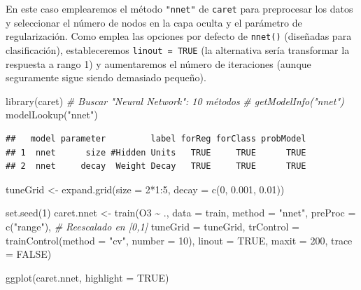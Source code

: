 \documentclass[
  spanish,
]{book}
\newenvironment{Shaded}{\begin{snugshade}}{\end{snugshade}}
\newcommand{\AttributeTok}[1]{\textcolor[rgb]{0.77,0.63,0.00}{#1}}
\newcommand{\CommentTok}[1]{\textcolor[rgb]{0.56,0.35,0.01}{\textit{#1}}}
\newcommand{\ConstantTok}[1]{\textcolor[rgb]{0.00,0.00,0.00}{#1}}
\newcommand{\DecValTok}[1]{\textcolor[rgb]{0.00,0.00,0.81}{#1}}
\newcommand{\FloatTok}[1]{\textcolor[rgb]{0.00,0.00,0.81}{#1}}
\newcommand{\FunctionTok}[1]{\textcolor[rgb]{0.00,0.00,0.00}{#1}}
\newcommand{\NormalTok}[1]{#1}
\newcommand{\OtherTok}[1]{\textcolor[rgb]{0.56,0.35,0.01}{#1}}
\newcommand{\SpecialCharTok}[1]{\textcolor[rgb]{0.00,0.00,0.00}{#1}}
\newcommand{\StringTok}[1]{\textcolor[rgb]{0.31,0.60,0.02}{#1}}
\theoremstyle{break}
\theoremstyle{definition}
\theoremstyle{definition}
\theoremstyle{definition}
\theoremstyle{definition}
\theoremstyle{remark}
\begin{document}
En este caso emplearemos el método \texttt{"nnet"} de \texttt{caret} para preprocesar los datos y seleccionar el número de nodos en la capa oculta y el parámetro de regularización.
Como emplea las opciones por defecto de \texttt{nnet()} (diseñadas para clasificación),
estableceremos \texttt{linout\ =\ TRUE} (la alternativa sería transformar la respuesta a rango 1) y aumentaremos el número de iteraciones (aunque seguramente sigue siendo demasiado pequeño).

\begin{Shaded}
\begin{Highlighting}[]
\FunctionTok{library}\NormalTok{(caret)}
\CommentTok{\# Buscar "Neural Network": 10 métodos}
\CommentTok{\# getModelInfo("nnet")}
\FunctionTok{modelLookup}\NormalTok{(}\StringTok{"nnet"}\NormalTok{)}
\end{Highlighting}
\end{Shaded}

\begin{verbatim}
##   model parameter         label forReg forClass probModel
## 1  nnet      size #Hidden Units   TRUE     TRUE      TRUE
## 2  nnet     decay  Weight Decay   TRUE     TRUE      TRUE
\end{verbatim}

\begin{Shaded}
\begin{Highlighting}[]
\NormalTok{tuneGrid }\OtherTok{\textless{}{-}} \FunctionTok{expand.grid}\NormalTok{(}\AttributeTok{size =} \DecValTok{2}\SpecialCharTok{*}\DecValTok{1}\SpecialCharTok{:}\DecValTok{5}\NormalTok{, }\AttributeTok{decay =} \FunctionTok{c}\NormalTok{(}\DecValTok{0}\NormalTok{, }\FloatTok{0.001}\NormalTok{, }\FloatTok{0.01}\NormalTok{))}

\FunctionTok{set.seed}\NormalTok{(}\DecValTok{1}\NormalTok{)}
\NormalTok{caret.nnet }\OtherTok{\textless{}{-}} \FunctionTok{train}\NormalTok{(O3 }\SpecialCharTok{\textasciitilde{}}\NormalTok{ ., }\AttributeTok{data =}\NormalTok{ train, }\AttributeTok{method =} \StringTok{"nnet"}\NormalTok{,}
             \AttributeTok{preProc =} \FunctionTok{c}\NormalTok{(}\StringTok{"range"}\NormalTok{), }\CommentTok{\# Reescalado en [0,1]}
             \AttributeTok{tuneGrid =}\NormalTok{ tuneGrid,}
             \AttributeTok{trControl =} \FunctionTok{trainControl}\NormalTok{(}\AttributeTok{method =} \StringTok{"cv"}\NormalTok{, }\AttributeTok{number =} \DecValTok{10}\NormalTok{), }
             \AttributeTok{linout =} \ConstantTok{TRUE}\NormalTok{, }\AttributeTok{maxit =} \DecValTok{200}\NormalTok{, }\AttributeTok{trace =} \ConstantTok{FALSE}\NormalTok{)}

\FunctionTok{ggplot}\NormalTok{(caret.nnet, }\AttributeTok{highlight =} \ConstantTok{TRUE}\NormalTok{)}
\end{Highlighting}
\end{Shaded}
\end{document}
